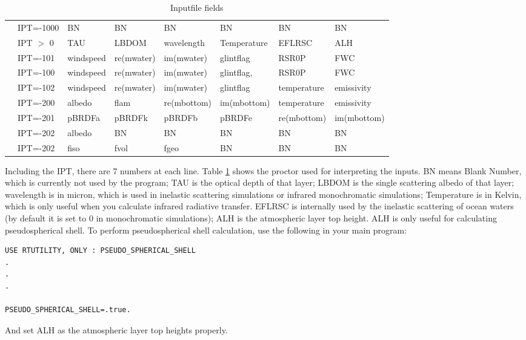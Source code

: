 \documentclass[10pt,letterpaper]{article}
\begin{document}
\begin{table}
\caption{Inputfile fields}
\vspace{0.2 in}
\centering
\begin{tabular}{llllllll}
&IPT=-1000 & BN&BN&BN& BN&BN&BN \\
&IPT $>$ 0 &TAU&LBDOM&wavelength&Temperature&EFLRSC&ALH \\
&IPT=-101  & windspeed & re(mwater) & im(mwater) & glintflag & RSR0P & FWC \\
&IPT=-100  & windspeed & re(mwater) & im(mwater) & glintflag,& RSR0P & FWC \\
&IPT=-102 & windspeed& re(mwater)& im(mwater)&glintflag&temperature&emissivity \\
&IPT=-200 & albedo &flam&re(mbottom)&im(mbottom)&temperature&emissivity \\
&IPT=-201 & pBRDFa&pBRDFk&pBRDFb&pBRDFe&re(mbottom)&im(mbottom) \\
&IPT=-202  & albedo& BN& BN& BN& BN& BN \\
&IPT=-202  & fiso &fvol & fgeo & BN & BN& BN \\
\end{tabular}
\label{tab:InputFile}
\end{table}

Including the IPT, there are 7 numbers at each line.  Table \ref{tab:InputFile} shows the proctor used for interpreting the inputs. BN means Blank Number, which is currently not used by the program; TAU is the optical depth of that layer; LBDOM is the single scattering albedo of that layer; wavelength is in micron, which is used in inelastic scattering simulations or infrared monochromatic simulations; Temperature is in Kelvin, which is only useful when you calculate infrared radiative transfer. EFLRSC is internally used by the inelastic scattering of ocean waters (by default it is set to 0 in monochromatic simulations); ALH is the atmospheric layer top height. ALH is only useful for calculating pseudospherical shell. To perform pseudospherical shell calculation, use the following in your main program:

\begin{verbatim}
USE RTUTILITY, ONLY : PSEUDO_SPHERICAL_SHELL
.
.
.

PSEUDO_SPHERICAL_SHELL=.true.
\end{verbatim}

\noindent And set ALH as the atmospheric layer top heights properly.
\end{document}
